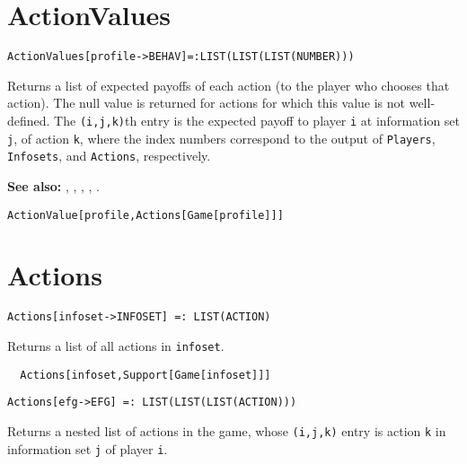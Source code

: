 
\section*{ActionValues}\label{ExtActionValues}
\begin{verbatim}
ActionValues[profile->BEHAV]=:LIST(LIST(LIST(NUMBER)))
\end{verbatim}

Returns a list of expected payoffs of each action (to the player
who chooses that action).  The null value is returned for actions for
which this value is not well-defined.  The \verb+(i,j,k)+th entry is
the expected payoff to player \verb+i+ at information set \verb+j+, of
action \verb+k+, where the index numbers correspond to the output of
\verb+Players+, \verb+Infosets+, and \verb+Actions+, respectively.

\textbf{See also:}
,
,
,
,
.

\udfbody
\begin{verbatim}
ActionValue[profile,Actions[Game[profile]]]
\end{verbatim} 


\section*{Actions}\label{ExtActions}
\begin{verbatim}
Actions[infoset->INFOSET] =: LIST(ACTION) 
\end{verbatim}

Returns a list of all actions in \verb+infoset+.

\udfbody
\begin{verbatim}
  Actions[infoset,Support[Game[infoset]]]
\end{verbatim} 

\latexignore{\hrule}
\begin{verbatim}
Actions[efg->EFG] =: LIST(LIST(LIST(ACTION))) 
\end{verbatim}

Returns a nested list of actions in the game, whose  \verb+(i,j,k)+
entry is action \verb+k+ in information set \verb+j+ of player \verb+i+.

